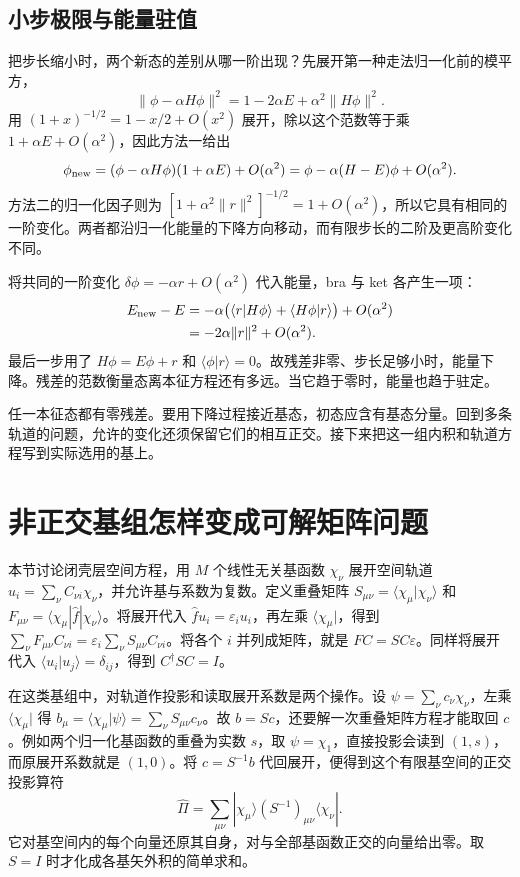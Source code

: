 \subsection{小步极限与能量驻值}
把步长缩小时，两个新态的差别从哪一阶出现？先展开第一种走法归一化前的模平方，
\begin{equation}
\|\phi-\alpha H\phi\|^2=1-2\alpha E+\alpha^2\|H\phi\|^2.
\end{equation}
用 $(1+x)^{-1/2}=1-x/2+O(x^2)$ 展开，除以这个范数等于乘 $1+\alpha E+O(\alpha^2)$，因此方法一给出
\begin{equation}
\phi_{\rm new}=(\phi-\alpha H\phi)(1+\alpha E)+O(\alpha^2)
=\phi-\alpha(H-E)\phi+O(\alpha^2).
\end{equation}
方法二的归一化因子则为 $[1+\alpha^2\|r\|^2]^{-1/2}=1+O(\alpha^2)$，所以它具有相同的一阶变化。两者都沿归一化能量的下降方向移动，而有限步长的二阶及更高阶变化不同。

将共同的一阶变化 $\delta\phi=-\alpha r+O(\alpha^2)$ 代入能量，bra 与 ket 各产生一项：
\begin{align}
E_{\rm new}-E
&=-\alpha\bigl(\langle r|H\phi\rangle+\langle H\phi|r\rangle\bigr)+O(\alpha^2)\notag\\
&=-2\alpha\|r\|^2+O(\alpha^2).
\end{align}
最后一步用了 $H\phi=E\phi+r$ 和 $\langle\phi|r\rangle=0$。故残差非零、步长足够小时，能量下降。残差的范数衡量态离本征方程还有多远。当它趋于零时，能量也趋于驻定。

任一本征态都有零残差。要用下降过程接近基态，初态应含有基态分量。回到多条轨道的问题，允许的变化还须保留它们的相互正交。接下来把这一组内积和轨道方程写到实际选用的基上。

\section{非正交基组怎样变成可解矩阵问题}
本节讨论闭壳层空间方程，用 $M$ 个线性无关基函数 $\chi_\nu$ 展开空间轨道 $u_i=\sum_\nu C_{\nu i}\chi_\nu$，并允许基与系数为复数。定义重叠矩阵 $S_{\mu\nu}=\langle\chi_\mu|\chi_\nu\rangle$ 和 $F_{\mu\nu}=\langle\chi_\mu|\hat f|\chi_\nu\rangle$。将展开代入 $\hat f u_i=\varepsilon_i u_i$，再左乘 $\langle\chi_\mu|$，得到 $\sum_\nu F_{\mu\nu}C_{\nu i}=\varepsilon_i\sum_\nu S_{\mu\nu}C_{\nu i}$。将各个 $i$ 并列成矩阵，就是 $FC=SC\varepsilon$。同样将展开代入 $\langle u_i|u_j\rangle=\delta_{ij}$，得到 $C^\dagger SC=I$。

在这类基组中，对轨道作投影和读取展开系数是两个操作。设 $\psi=\sum_\nu c_\nu\chi_\nu$，左乘 $\langle\chi_\mu|$ 得 $b_\mu=\langle\chi_\mu|\psi\rangle=\sum_\nu S_{\mu\nu}c_\nu$。故 $b=Sc$，还要解一次重叠矩阵方程才能取回 $c$。例如两个归一化基函数的重叠为实数 $s$，取 $\psi=\chi_1$，直接投影会读到 $(1,s)$，而原展开系数就是 $(1,0)$。将 $c=S^{-1}b$ 代回展开，便得到这个有限基空间的正交投影算符
\[
 \hat\Pi=\sum_{\mu\nu}|\chi_\mu\rangle(S^{-1})_{\mu\nu}\langle\chi_\nu| .
\]
它对基空间内的每个向量还原其自身，对与全部基函数正交的向量给出零。取 $S=I$ 时才化成各基矢外积的简单求和。

